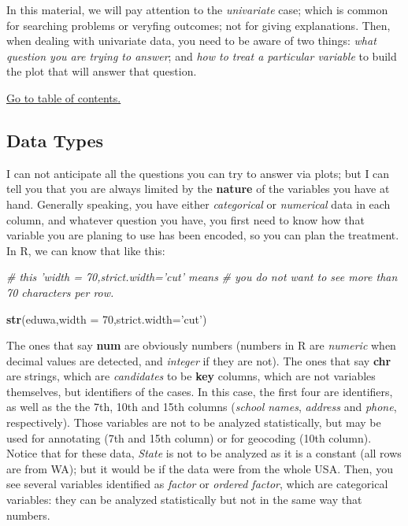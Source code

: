 \documentclass[]{article}
\newenvironment{Shaded}{\begin{snugshade}}{\end{snugshade}}
\newcommand{\KeywordTok}[1]{\textcolor[rgb]{0.13,0.29,0.53}{\textbf{#1}}}
\newcommand{\DataTypeTok}[1]{\textcolor[rgb]{0.13,0.29,0.53}{#1}}
\newcommand{\DecValTok}[1]{\textcolor[rgb]{0.00,0.00,0.81}{#1}}
\newcommand{\StringTok}[1]{\textcolor[rgb]{0.31,0.60,0.02}{#1}}
\newcommand{\CommentTok}[1]{\textcolor[rgb]{0.56,0.35,0.01}{\textit{#1}}}
\newcommand{\NormalTok}[1]{#1}
\begin{document}
In this material, we will pay attention to the \emph{univariate} case;
which is common for searching problems or veryfing outcomes; not for
giving explanations. Then, when dealing with univariate data, you need
to be aware of two things: \emph{what question you are trying to
answer}; and \emph{how to treat a particular variable} to build the plot
that will answer that question.

\protect\hyperlink{part1}{Go to table of contents.}

\subsection{Data Types}\label{data-types}

I can not anticipate all the questions you can try to answer via plots;
but I can tell you that you are always limited by the \textbf{nature} of
the variables you have at hand. Generally speaking, you have either
\emph{categorical} or \emph{numerical} data in each column, and whatever
question you have, you first need to know how that variable you are
planing to use has been encoded, so you can plan the treatment. In R, we
can know that like this:

\begin{Shaded}
\begin{Highlighting}[]
\CommentTok{# this 'width = 70,strict.width='cut' means}
\CommentTok{# you do not want to see more than 70 characters per row.}

\KeywordTok{str}\NormalTok{(eduwa,}\DataTypeTok{width =} \DecValTok{70}\NormalTok{,}\DataTypeTok{strict.width=}\StringTok{'cut'}\NormalTok{)}
\end{Highlighting}
\end{Shaded}

The ones that say \textbf{num} are obviously numbers (numbers in R are
\emph{numeric} when decimal values are detected, and \emph{integer} if
they are not). The ones that say \textbf{chr} are strings, which are
\emph{candidates} to be \textbf{key} columns, which are not variables
themselves, but identifiers of the cases. In this case, the first four
are identifiers, as well as the the 7th, 10th and 15th columns
(\emph{school names}, \emph{address} and \emph{phone}, respectively).
Those variables are not to be analyzed statistically, but may be used
for annotating (7th and 15th column) or for geocoding (10th column).
Notice that for these data, \emph{State} is not to be analyzed as it is
a constant (all rows are from WA); but it would be if the data were from
the whole USA. Then, you see several variables identified as
\emph{factor} or \emph{ordered factor}, which are categorical variables:
they can be analyzed statistically but not in the same way that numbers.
\end{document}

